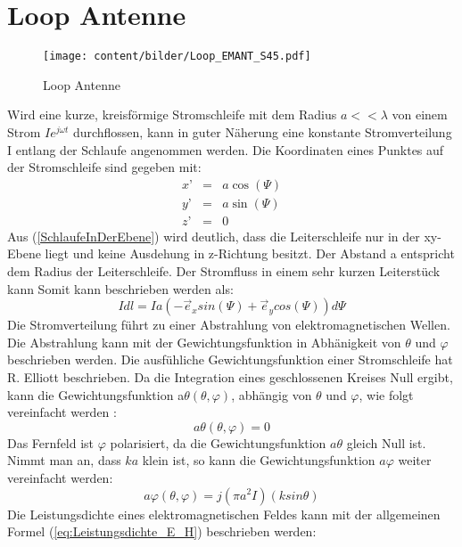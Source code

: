 
\section{Loop Antenne}\label{sec:LoopAntenneTheorie}
\begin{figure}[h]
	\centering
	\texttt{[image: content/bilder/Loop\_EMANT\_S45.pdf]}%
	\caption{Loop Antenne}
	\label{LoopAntenne}
\end{figure}
Wird eine kurze, kreisförmige Stromschleife mit dem Radius $a<<\lambda$ von einem Strom $Ie^{j\omega t}$ durchflossen, kann in guter Näherung eine konstante Stromverteilung I entlang der Schlaufe angenommen werden. Die Koordinaten eines Punktes auf der Stromschleife sind gegeben mit:
\begin{eqnarray}
x’ &=& a \cos(\Psi)\\
y’ &=& a \sin(\Psi)\\
z’ &=& 0\label{SchlaufeInDerEbene}
\end{eqnarray}
Aus  (\ref{SchlaufeInDerEbene}) wird deutlich, dass die Leiterschleife nur in der xy-Ebene liegt und keine Ausdehung in z-Richtung besitzt. Der Abstand a entspricht dem Radius der Leiterschleife. Der Stromfluss in einem sehr kurzen Leiterstück kann Somit kann beschrieben werden als:
\begin{equation}
I dl= Ia(- \vec e_{x}sin(\Psi)+\vec e_{y}cos(\Psi))d\Psi
\end{equation}
Die Stromverteilung führt zu einer Abstrahlung von elektromagnetischen Wellen. Die Abstrahlung kann mit der Gewichtungsfunktion in Abhänigkeit von $\theta$ und $\varphi$ beschrieben werden. Die ausfühliche Gewichtungsfunktion einer Stromschleife hat R. Elliott \cite{elliott1981antenna} beschrieben. Da die Integration eines geschlossenen Kreises Null ergibt, kann die Gewichtungsfunktion a$\theta(\theta, \varphi)$, abhängig von $\theta$ und $\varphi$, wie folgt vereinfacht werden \cite{Emant}:
\begin{equation}\label{GewichtungsfunktionLoop_aTheta}
a\theta(\theta, \varphi) =0
\end{equation}
Das Fernfeld ist $\varphi$ polarisiert, da die Gewichtungsfunktion $a\theta$ gleich Null ist. Nimmt man an, dass $ka$ klein ist, so kann die Gewichtungsfunktion $a\varphi$ weiter vereinfacht werden:
\begin{equation}
a\varphi(\theta,\varphi)=j(\pi a^{2}I)(k sin \theta)
\end{equation}
Die Leistungsdichte eines elektromagnetischen Feldes kann mit der allgemeinen Formel (\ref{eq:Leistungsdichte_E_H}) beschrieben werden: 

